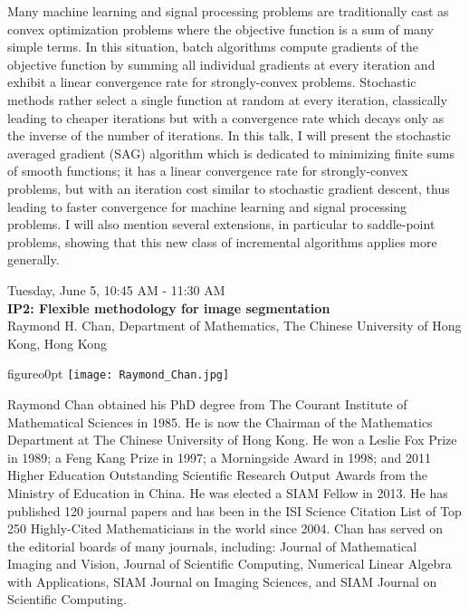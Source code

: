 Many machine learning and signal processing problems are traditionally cast as convex optimization problems where the objective function is a sum of many simple terms. In this situation, batch algorithms compute gradients of the objective function by summing all individual gradients at every iteration and exhibit a linear convergence rate for strongly-convex problems. Stochastic methods rather select a single function at random at every iteration, classically leading to cheaper iterations but with a convergence rate which decays only as the inverse of the number of iterations. In this talk, I will present the stochastic averaged gradient (SAG) algorithm which is dedicated to minimizing finite sums of smooth functions; it has a linear convergence rate for strongly-convex problems, but with an iteration cost similar to stochastic gradient descent, thus leading to faster convergence for machine learning and signal processing problems. I will also mention several extensions, in particular to saddle-point problems, showing that this new class of incremental algorithms applies more generally.



\newpage\vspace{2cm}
\begin{center}{\Large{
Tuesday, June 5, 10:45 AM - 11:30 AM \\
\textbf{IP2: Flexible methodology for image segmentation}\\
Raymond H. Chan, Department of Mathematics, The Chinese University of Hong Kong,  Hong Kong}}
\end{center}
\vspace{1cm}

\begin{wrapfloat}{figure}{o}{0pt}
\texttt{[image: Raymond\_Chan.jpg]}
\end{wrapfloat}

Raymond Chan obtained his PhD degree from The Courant Institute of Mathematical Sciences in 1985. He is now the Chairman of the Mathematics Department at The Chinese University of Hong Kong. He won a Leslie Fox Prize in 1989; a Feng Kang Prize in 1997; a Morningside Award in 1998; and 2011 Higher Education Outstanding Scientific Research Output Awards from the Ministry of Education in China. He was elected a SIAM Fellow in 2013. He has published 120 journal papers and has been in the ISI Science Citation List of Top 250 Highly-Cited Mathematicians in the world since 2004. Chan has served on the editorial boards of many journals, including: Journal of Mathematical Imaging and Vision, Journal of Scientific Computing, Numerical Linear Algebra with Applications, SIAM Journal on Imaging Sciences, and SIAM Journal on Scientific Computing. 

